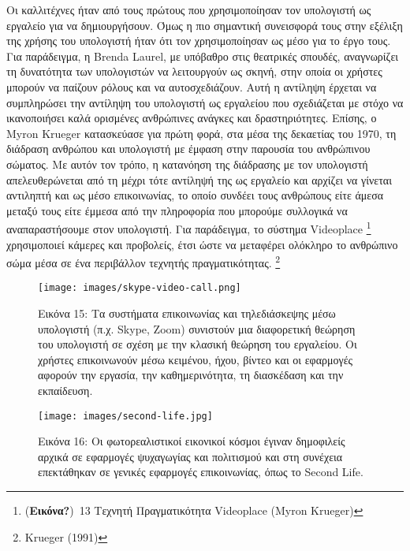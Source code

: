 \documentclass[
]{article}
\begin{document}
Οι καλλιτέχνες ήταν από τους πρώτους που χρησιμοποίησαν τον υπολογιστή
ως εργαλείο για να δημιουργήσουν. Όμως η πιο σημαντική συνεισφορά τους
στην εξέλιξη της χρήσης του υπολογιστή ήταν ότι τον χρησιμοποίησαν ως
μέσο για το έργο τους. Για παράδειγμα, η Brenda Laurel, με υπόβαθρο στις
θεατρικές σπουδές, αναγνωρίζει τη δυνατότητα των υπολογιστών να
λειτουργούν ως σκηνή, στην οποία οι χρήστες μπορούν να παίζουν ρόλους
και να αυτοσχεδιάζουν. Αυτή η αντίληψη έρχεται να συμπληρώσει την
αντίληψη του υπολογιστή ως εργαλείου που σχεδιάζεται με στόχο να
ικανοποιήσει καλά ορισμένες ανθρώπινες ανάγκες και δραστηριότητες.
Επίσης, ο Myron Krueger κατασκεύασε για πρώτη φορά, στα μέσα της
δεκαετίας του 1970, τη διάδραση ανθρώπου και υπολογιστή με έμφαση στην
παρουσία του ανθρώπινου σώματος. Με αυτόν τον τρόπο, η κατανόηση της
διάδρασης με τον υπολογιστή απελευθερώνεται από τη μέχρι τότε αντίληψή
της ως εργαλείο και αρχίζει να γίνεται αντιληπτή και ως μέσο
επικοινωνίας, το οποίο συνδέει τους ανθρώπους είτε άμεσα μεταξύ τους
είτε έμμεσα από την πληροφορία που μπορούμε συλλογικά να αναπαραστήσουμε
στον υπολογιστή. Για παράδειγμα, το σύστημα Videoplace \footnote{(\textbf{Εικόνα?})~13
  Τεχνητή Πραγματικότητα Videoplace (Myron Krueger)} χρησιμοποιεί
κάμερες και προβολείς, έτσι ώστε να μεταφέρει ολόκληρο το ανθρώπινο σώμα
μέσα σε ένα περιβάλλον τεχνητής πραγματικότητας. \footnote{Krueger
  (1991)}

\leavevmode{}%
\begin{figure}
\hypertarget{fig:skype-video-call}{%
\centering
\texttt{[image: images/skype-video-call.png]}
\caption{Εικόνα 15: Τα συστήματα επικοινωνίας και τηλεδιάσκεψης μέσω
υπολογιστή (π.χ. Skype, Zoom) συνιστούν μια διαφορετική θεώρηση του
υπολογιστή σε σχέση με την κλασική θεώρηση του εργαλείου. Οι χρήστες
επικοινωνούν μέσω κειμένου, ήχου, βίντεο και οι εφαρμογές αφορούν την
εργασία, την καθημερινότητα, τη διασκέδαση και την
εκπαίδευση.}\label{fig:skype-video-call}
}
\end{figure}

\leavevmode{}%
\begin{figure}
\hypertarget{fig:second-life}{%
\centering
\texttt{[image: images/second-life.jpg]}
\caption{Εικόνα 16: Οι φωτορεαλιστικοί εικονικοί κόσμοι έγιναν
δημοφιλείς αρχικά σε εφαρμογές ψυχαγωγίας και πολιτισμού και στη
συνέχεια επεκτάθηκαν σε γενικές εφαρμογές επικοινωνίας, όπως το Second
Life.}\label{fig:second-life}
}
\end{figure}
\end{document}
